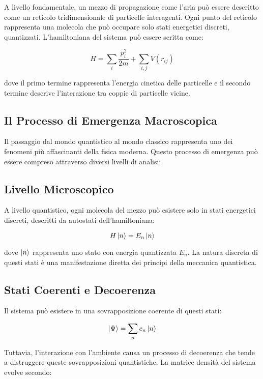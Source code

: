 \documentclass[a4paper,11pt]{article}
\begin{document}
A livello fondamentale, un mezzo di propagazione come l'aria può essere
descritto come un reticolo tridimensionale di particelle interagenti.
Ogni punto del reticolo rappresenta una molecola che può occupare solo
stati energetici discreti, quantizzati. L'hamiltoniana del sistema può
essere scritta come:

\begin{equation}
H = \sum_i \frac{p_i^2}{2m} + \sum_{i,j} V(r_{ij})
\end{equation}


dove il primo termine rappresenta l'energia cinetica delle particelle e
il secondo termine descrive l'interazione tra coppie di particelle
vicine.

\subsection{Il Processo di Emergenza Macroscopica}

Il passaggio dal mondo quantistico al mondo classico rappresenta uno dei
fenomeni più affascinanti della fisica moderna. Questo processo di
emergenza può essere compreso attraverso diversi livelli di analisi:

\subsection{Livello Microscopico}

A livello quantistico, ogni molecola del mezzo può esistere solo in
stati energetici discreti, descritti da autostati dell'hamiltoniana:

\begin{equation}
H\ket{n} = E_n\ket{n}
\end{equation}


dove $\ket{n}$ rappresenta uno stato con energia quantizzata $E_n$. La
natura discreta di questi stati è una manifestazione diretta dei
principi della meccanica quantistica.

\subsection{Stati Coerenti e Decoerenza}

Il sistema può esistere in una sovrapposizione coerente di questi stati:

\begin{equation}
\ket{\Psi} = \sum_n c_n \ket{n}
\end{equation}


Tuttavia, l'interazione con l'ambiente causa un processo di decoerenza
che tende a distruggere queste sovrapposizioni quantistiche. La matrice
densità del sistema evolve secondo:
\end{document}
